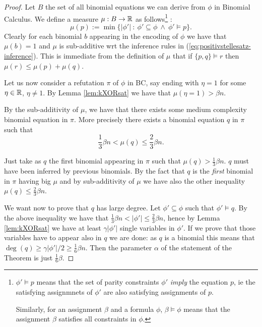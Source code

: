 \documentclass[a4paper,twoside,justified]{tufte-handout}
\begin{document}
\begin{proof}
Let $B$ the set of all binomial equations we can derive from $\phi$ in Binomial Calculus. 
We define a measure $\mu:B\rightarrow \mathbb{R}$ as follows\footnote{
$\phi'\models p$ means that the set of parity constraints $\phi'$ \emph{imply} the equation $p$, ie the satisfying assignmnets of $\phi'$ are also satisfying assignments of $p$.

Similarly, for an assignment $\beta$ and a formula $\phi$, $\beta \models \phi$ means that the assignment $\beta$ satisfies
all constraints in $\phi$.
}
:
\begin{equation}\label{eq:mu-kXOR}
\mu(p):=\min\{|\phi'|\ :\ \phi'\subseteq \phi\ \wedge\ \phi'\models p\}.
\end{equation}
Clearly for each binomial $b$ appearing in the encoding of $\phi$ we have that $\mu(b)= 1$ and $\mu$ is sub-additive wrt the inference rules in (\ref{eq:positivstellesatz-inference}). This is immediate from the definition of $\mu$ that if $\{p,q\}\models r$ then $\mu(r)\leq \mu(p)+\mu(q)$. 

Let us now consider a refutation $\pi$ of $\phi$ in BC, say ending with $\eta=1$ for some $\eta\in \mathbb{R}$, $\eta\neq 1$. By Lemma \ref{lem:kXORsat} we have that $\mu(\eta=1)>\beta n$.

By the sub-additivity of $\mu$, we have that there exists some medium complexity binomial equation in $\pi$. 
More precisely there exists a binomial equation $q$ in $\pi$ such that
\begin{equation*}
\frac{1}{3}\beta n< \mu(q) \le \frac{2}{3}\beta n.
\end{equation*}

Just take as $q$ the first binomial appearing in $\pi$ such that $\mu(q)>\frac{1}{3}\beta n$. $q$ must have been inferred by previous binomials. 
By the fact that $q$ is the \emph{first} binomial in $\pi$ having big $\mu$ and by sub-additivity of $\mu$ we have also the other inequality
$\mu(q) \leq \frac{2}{3} \beta n$.

We want now to prove that $q$ has large degree. Let $\phi'\subseteq \phi$ such that $\phi'\models q$. 
By the above inequality we have that $\frac{1}{3}\beta n < |\phi'| \leq \frac{2}{3}\beta n$, hence by Lemma \ref{lem:kXORsat} we have at least $\gamma |\phi'|$ single variables in $\phi'$. 
If we prove that those variables have to appear also in $q$ we are done: as $q$ is a binomial this means that $\deg(q)\geq \gamma |\phi'|/2\geq \frac{1}{6}\beta n$. 
Then the parameter $\alpha$ of the statement of the Theorem is just $\frac{1}{6}\beta$.


\end{proof}
\end{document}
